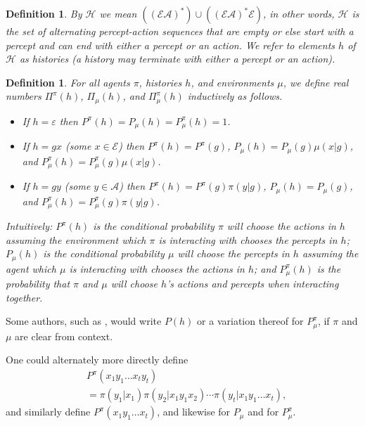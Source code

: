 \documentclass[twoside]{article}
\newtheorem{definition}[theorem]{Definition}
\begin{document}
\begin{definition}
    By $\mathcal H$ we mean
    $((\mathcal E\mathcal A)^*)\cup((\mathcal E\mathcal A)^*\mathcal E)$,
    in other words, $\mathcal H$ is the set of alternating percept-action
    sequences that are empty or else start with a percept and can end with
    either a percept or an action.
    We refer to elements $h$ of $\mathcal H$ as \emph{histories} (a history
    may terminate with either a percept or an action).
\end{definition}

\begin{definition}
\label{pullbackdef}
    For all agents $\pi$, histories $h$, and environments $\mu$,
    we define real numbers $\Pi^\pi(h)$, $\Pi_\mu(h)$, and $\Pi^\pi_\mu(h)$
    inductively as follows.
    \begin{itemize}
        \item
        If $h=\varepsilon$ then $P^\pi(h)=P_\mu(h)=P^\pi_\mu(h)=1$.
        \item
        If $h=gx$ (some $x\in\mathcal E$) then
        $P^\pi(h)=P^\pi(g)$, $P_\mu(h)=P_\mu(g)\mu(x|g)$,
        and $P^\pi_\mu(h)=P^\pi_\mu(g)\mu(x|g)$.
        \item
        If $h=gy$ (some $y\in\mathcal A$) then
        $P^\pi(h)=P^\pi(g)\pi(y|g)$, $P_\mu(h)=P_\mu(g)$,
        and $P^\pi_\mu(h)=P^\pi_\mu(g)\pi(y|g)$.
    \end{itemize}
    Intuitively: $P^\pi(h)$ is the conditional
    probability $\pi$ will choose the actions in $h$ assuming the
    environment which $\pi$ is interacting with chooses the percepts in
    $h$; $P_\mu(h)$ is the conditional probability $\mu$ will choose
    the percepts in $h$ assuming the agent which $\mu$ is interacting
    with chooses the actions in $h$; and $P^\pi_\mu(h)$ is the probability
    that $\pi$ and $\mu$ will choose $h$'s actions and percepts when
    interacting together.
\end{definition}

Some authors, such as \cite{hutter2009discrete}, would write $P(h)$ or a variation thereof
for $P^\pi_\mu$, if $\pi$ and $\mu$ are clear from context.

One could alternately more directly define
\begin{align*}
    {} & P^\pi(x_1y_1\ldots x_ty_t)\\
    &= \pi(y_1|x_1)\pi(y_2|x_1y_1x_2)\cdots \pi(y_t|x_1y_1\ldots x_t),
\end{align*}
and similarly define $P^\pi(x_1y_1\ldots x_t)$,
and likewise for $P_\mu$ and for $P^\pi_\mu$.
\end{document}
